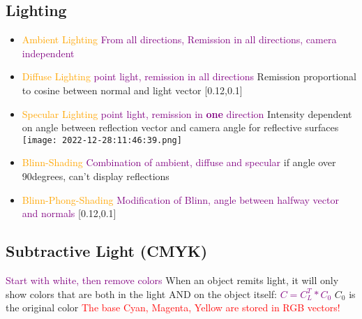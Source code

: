 \documentclass[main.tex,fontsize=12pt,paper=a4,paper=landscape,DIV=calc,]{scrartcl}
\begin{document}
\begin{multicols*}{4}
\section{Lighting}
\begin{itemize}
\item \textcolor{orange}{Ambient Lighting}\newline
\textcolor{purple}{From all directions, Remission in all directions, camera independent}\newline
\item \textcolor{orange}{Diffuse Lighting}\newline
\textcolor{purple}{point light, remission in all directions}\newline
Remission proportional to cosine between normal and light vector\newline
{}[0.12,0.1]
\item \textcolor{orange}{Specular Lighting}\newline
\textcolor{purple}{point light, remission in \textbf{one} direction}\newline
Intensity dependent on angle between reflection vector and camera angle\newline
\textcolor{OliveGreen}{for reflective surfaces}\newline
\texttt{[image: 2022-12-28:11:46:39.png]}
\item \textcolor{orange}{Blinn-Shading}\newline
  \textcolor{purple}{Combination of ambient, diffuse and specular}\newline
  if angle over 90degrees, can't display reflections
\item \textcolor{orange}{Blinn-Phong-Shading}\newline
  \textcolor{purple}{Modification of Blinn, angle between halfway vector and normals}\newline
  [0.12,0.1]
\end{itemize} 

\subsection{Subtractive Light (CMYK)}
\textcolor{purple}{Start with white, then remove colors}\newline
When an object remits light, it will only show colors that are both in the light AND on the object itself:\newline
\textcolor{purple}{\(C = C_L^T * C_0\)}\newline
\(C_0\) is the original color\newline
\textcolor{red}{The base Cyan, Magenta, Yellow are stored in RGB vectors!}


\end{multicols*}
\end{document}
